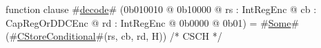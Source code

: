 function clause #\hyperref[zdecode]{decode}# (0b010010 @ 0b10000 @ rs : IntRegEnc @ cb : CapRegOrDDCEnc @ rd : IntRegEnc @ 0b0000 @ 0b01) = #\hyperref[zSome]{Some}#(#\hyperref[zCStoreConditional]{CStoreConditional}#(rs, cb, rd, H)) /* CSCH */
